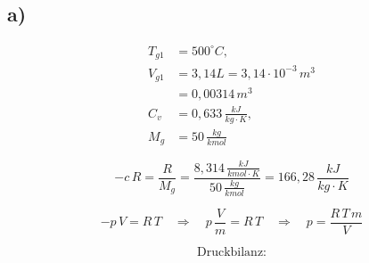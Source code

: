

\subsection*{a)}
\begin{align*}
    T_{g1} &= 500^\circ C, \\
    V_{g1} &= 3,14L = 3,14 \cdot 10^{-3} \, m^3 \\
    &= 0,00314 \, m^3 \\
    C_v &= 0,633 \, \frac{kJ}{kg \cdot K}, \\
    M_{g} &= 50 \, \frac{kg}{kmol}
\end{align*}

\[
-c \, R = \frac{R}{M_g} = \frac{8,314 \, \frac{kJ}{kmol \cdot K}}{50 \, \frac{kg}{kmol}} = 166,28 \, \frac{kJ}{kg \cdot K}
\]

\[
-p \, V = R \, T \quad \Rightarrow \quad p \, \frac{V}{m} = R \, T \quad \Rightarrow \quad p = \frac{R \, T \, m}{V}
\]

\[
\text{Druckbilanz:}
\]